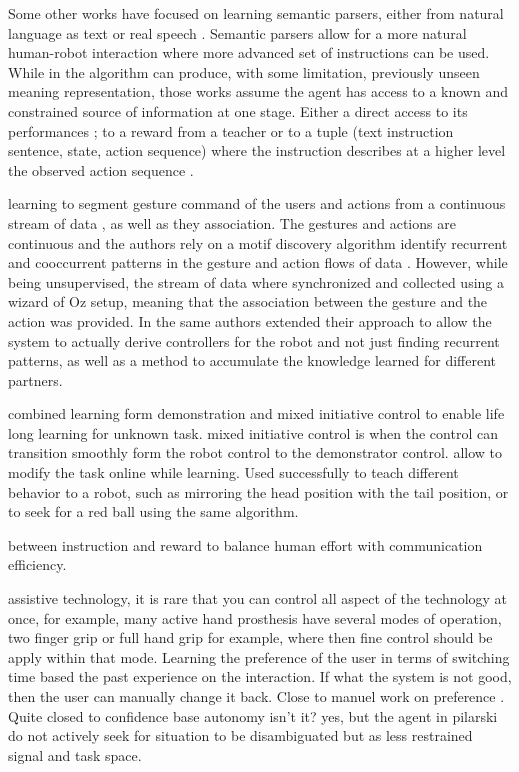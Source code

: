 Some other works have focused on learning semantic parsers, either from natural language as text \cite{branavan2011learning,kim2012unsupervised} or real speech \cite{doshi2008spoken}. Semantic parsers allow for a more natural human-robot interaction where more advanced set of instructions can be used. While in \cite{kim2012unsupervised} the algorithm can produce, with some limitation, previously unseen meaning representation, those works assume the agent has access to a known and constrained source of information at one stage. Either a direct access to its performances \cite{branavan2011learning}; to a reward from a teacher \cite{doshi2008spoken} or to a tuple (text instruction sentence, state, action sequence) where the instruction describes at a higher level the observed action sequence \cite{kim2012unsupervised}.


\cite{mohammad2009unsupervised} learning to segment gesture command of the users and actions from a continuous stream of data , as well as they association. The gestures and actions are continuous and the authors rely on a motif discovery algorithm identify recurrent  and cooccurrent patterns in the gesture and action flows of data \cite{mohammad2009constrained}. However, while being unsupervised, the stream of data where synchronized and collected using a wizard of Oz setup, meaning that the association between the gesture and the action was provided. In \cite{mohammad2010learning} the same authors extended their approach to allow the system to actually derive controllers for the robot and not just finding recurrent patterns, as well as a method to accumulate the knowledge learned for different partners.


\cite{grollman2007dogged} combined learning form demonstration and mixed initiative control to enable life long learning for unknown task. mixed initiative control is when the control can transition smoothly form the robot control to the demonstrator control. allow to modify the task online while learning. Used successfully to teach different behavior to a robot, such as mirroring the head position with the tail position, or to seek for a red ball using the same algorithm.

\cite{pilarski2012between} between instruction and reward to balance human effort with communication efficiency.

assistive technology, it is rare that you can control all aspect of the technology at once, for example, many active hand prosthesis have several modes of operation, two finger grip or full hand grip for example, where then fine control should be apply within that mode. Learning the preference of the user in terms of switching time based the past experience on the interaction. If what the system is not good, then the user can manually change it back. Close to manuel work on preference \cite{Mason2011}. Quite closed to confidence base autonomy isn't it? \cite{chernova09jair} yes, but the agent in pilarski do not actively seek for situation to be disambiguated but as less restrained signal and task space.

